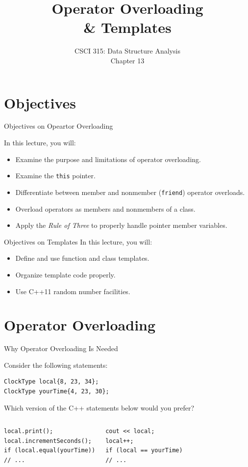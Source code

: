 \documentclass[14pt,aspectratio=1610, hyperref={pdfpagelayout=SinglePage}]{beamer}
\title{\Huge{}Operator Overloading \\{\&} Templates}
\subtitle{CSCI 315: Data Structure Analysis\\Chapter 13}
\institute{Charleston Southern University}
\begin{document}
\begin{frame}
  \titlepage
\end{frame}

\section{Objectives}

\begin{frame}[fragile]{Objectives on Opeartor Overloading}

In this lecture, you will:
\begin{itemize}
\item
  Examine the purpose and limitations of operator overloading.
\item
  Examine the \lstinline{this} pointer.
\item
  Differentiate between member and nonmember (\lstinline{friend}) operator overloads.
\item
  Overload operators as members and nonmembers of a class.
\item
  Apply the \emph{Rule of Three} to properly handle pointer member variables.
\end{itemize}
\end{frame}

\begin{frame}{Objectives on Templates}
In this lecture, you will:
\begin{itemize}
\item
  Define and use function and class templates.
\item
  Organize template code properly.
\item
  Use C++11 random number facilities.
\end{itemize}
\end{frame}

\section{Operator Overloading}

\begin{frame}[fragile]{Why Operator Overloading Is Needed}
\protect\hypertarget{why-operator-overloading-is-needed-1-of-2}{}

Consider the following statements:
\begin{lstlisting}
ClockType local{8, 23, 34};
ClockType yourTime{4, 23, 30};
\end{lstlisting}

Which version of the C++ statements below would you prefer?
\begin{columns}[T]
\begin{lstlisting}[basicstyle=\ttfamily\small]
local.print();
local.incrementSeconds();
if (local.equal(yourTime))
// ...
\end{lstlisting}

\begin{lstlisting}[basicstyle=\ttfamily\small, xleftmargin=0pt]
cout << local;
local++;
if (local == yourTime)
// ...
\end{lstlisting}
\end{columns}
\end{frame}
\end{document}
